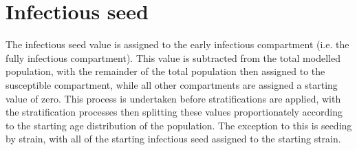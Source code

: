 \section{Infectious seed}
The infectious seed value is assigned to the early infectious compartment
(i.e. the fully infectious compartment).
This value is subtracted from the total modelled population,
with the remainder of the total population then assigned to the susceptible compartment, 
while all other compartments are assigned a starting value of zero.
This process is undertaken before stratifications are applied,
with the stratification processes then splitting these values proportionately
according to the starting age distribution of the population.
The exception to this is seeding by strain,
with all of the starting infectious seed assigned to the starting strain.
